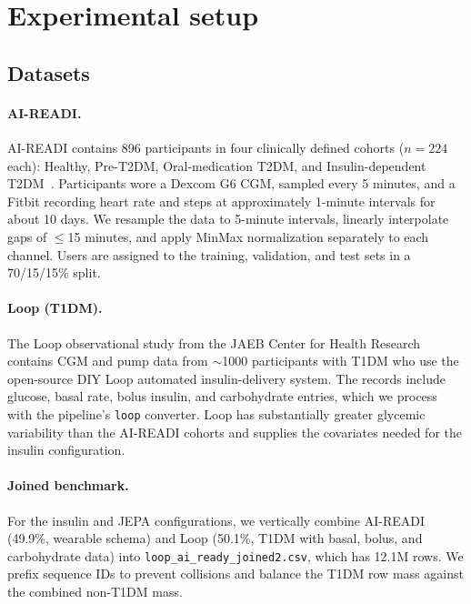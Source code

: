 \documentclass[11pt,a4paper]{article}
\begin{document}
\section{Experimental setup}
\label{app:setup}

\subsection{Datasets}

\paragraph{AI-READI.}
AI-READI contains 896 participants in four clinically defined cohorts ($n = 224$ each): Healthy, Pre-T2DM, Oral-medication T2DM, and Insulin-dependent T2DM~\citep{aireadi2024}.
Participants wore a Dexcom G6 CGM, sampled every 5 minutes, and a Fitbit recording heart rate and steps at approximately 1-minute intervals for about 10 days.
We resample the data to 5-minute intervals, linearly interpolate gaps of $\leq$15 minutes, and apply MinMax normalization separately to each channel.
Users are assigned to the training, validation, and test sets in a 70/15/15\% split.

\paragraph{Loop (T1DM).}
The Loop observational study from the JAEB Center for Health Research contains CGM and pump data from $\sim$1000 participants with T1DM who use the open-source DIY Loop automated insulin-delivery system.
The records include glucose, basal rate, bolus insulin, and carbohydrate entries, which we process with the pipeline's \texttt{loop} converter.
Loop has substantially greater glycemic variability than the AI-READI cohorts and supplies the covariates needed for the insulin configuration.

\paragraph{Joined benchmark.}
For the insulin and JEPA configurations, we vertically combine AI-READI (49.9\%, wearable schema) and Loop (50.1\%, T1DM with basal, bolus, and carbohydrate data) into \texttt{loop\_ai\_ready\_joined2.csv}, which has 12.1M rows.
We prefix sequence IDs to prevent collisions and balance the T1DM row mass against the combined non-T1DM mass.
\end{document}
